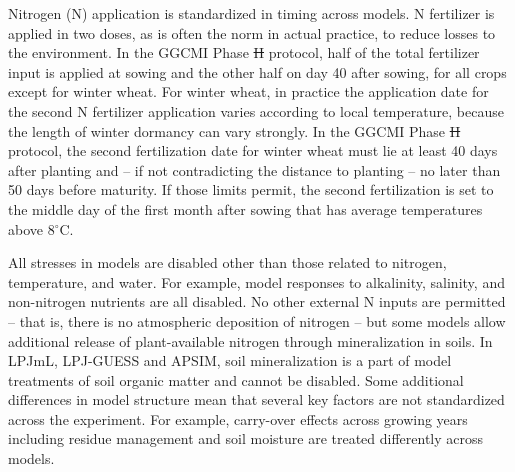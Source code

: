 \documentclass[gmd, manuscript]{copernicus} %
\providecommand{\DIFadd}[1]{{\protect\color{blue}\uwave{#1}}} %
\providecommand{\DIFdel}[1]{{\protect\color{red}\sout{#1}}}                      %
\providecommand{\DIFaddbegin}{} %
\providecommand{\DIFaddend}{} %
\providecommand{\DIFdelbegin}{} %
\providecommand{\DIFdelend}{} %
\begin{document}
Nitrogen (N) application is standardized in timing across models. 
N fertilizer is applied in two doses, as is often the norm in actual practice, to reduce losses to the environment. 
In the GGCMI Phase \DIFdelbegin \DIFdel{II }\DIFdelend \DIFaddbegin \DIFadd{2 }\DIFaddend protocol, half of the total fertilizer input is applied at sowing and the other half on day 40 after sowing, for all crops except for winter wheat. 
For winter wheat, in practice the application date for the second N fertilizer application varies according to local temperature, because the length of winter dormancy can vary strongly. 
In the GGCMI Phase \DIFdelbegin \DIFdel{II }\DIFdelend \DIFaddbegin \DIFadd{2 }\DIFaddend protocol, the second fertilization date for winter wheat must lie at least 40 days after planting and -- if not contradicting the distance to planting -- no later than 50 days before maturity.
If those limits permit, the second fertilization is set to the middle day of the first month after sowing that has average temperatures above 8$^\circ$C.

All stresses in models are disabled other than those related to nitrogen, temperature, and water. 
For example, model responses to alkalinity, salinity, and non-nitrogen nutrients are all disabled. 
No other external N inputs are permitted -- that is, there is no atmospheric deposition of nitrogen --  but some models allow additional release of plant-available nitrogen through mineralization in soils. 
In LPJmL, LPJ-GUESS and APSIM, soil mineralization is a part of model treatments of soil organic matter and cannot be disabled.
Some additional differences in model structure mean that several key factors are not standardized across the experiment. 
For example, carry-over effects across growing years including residue management and soil moisture are treated differently across models.
\end{document}
